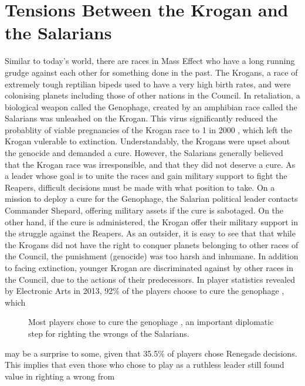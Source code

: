 \documentclass[journal]{IEEEtran}
\begin{document}
\section{Tensions Between the Krogan and the Salarians}

Similar to today's world, there are races in Mass Effect who have a
long running grudge against each other for something done in the past.
The Krogans, a race of extremely tough reptilian bipeds used to
have a very high birth rates, and were colonising planets including those
of other nations in the Council. In retaliation, a biological weapon
called the Genophage, created by an amphibian race called the Salarians was unleashed on the Krogan.
This virus significantly reduced the
probablity of viable pregnancies of the Krogan race to 1 in 2000 \cite{wikia} ,
which left the Krogan vulerable to extinction. Understandably, the Krogans
were upset about the genocide and demanded a cure. However, the Salarians generally believed that the Krogan race was irresponsible, and that they did not deserve a cure. As a leader whose goal is to unite the races and gain military support to fight the Reapers,
difficult decisions must be made with what position to take. On a mission
to deploy a cure for the Genophage, the Salarian political leader contacts
Commander Shepard, offering military assets if the cure is sabotaged. On the
other hand, if the cure is administered, the Krogan offer their military support
in the struggle against the Reapers. As an outsider, it is easy to see that that while the Krogans did not have the right to conquer planets belonging to other races of the Council, the punishment (genocide) was too harsh and inhumane. In addition to facing extinction, younger Krogan are discriminated against by other races in
the Council, due to
the actions of their predecessors.
In player statistics revealed by Electronic Arts in 2013, 92\% of the players choose to cure the genophage \cite{ea}, which
\begin{figure}[h!]
 \centering
 \caption{Most players chose to cure the genophage \cite{ea}, an important diplomatic step for righting the wrongs of the Salarians.}
\end{figure}
may be a surprise to some, given that 35.5\% of players chose Renegade decisions. This implies that even those who
chose to play as a ruthless leader still found value in righting a wrong from
\end{document}
